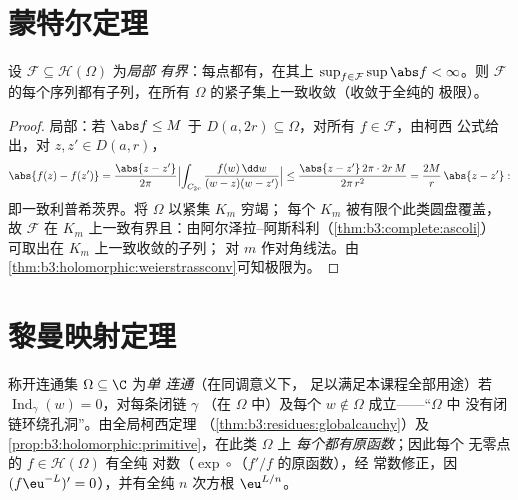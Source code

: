 \section{蒙特尔定理}

\begin{theorem}[蒙特尔]\label{thm:b3:conformal:montel}
设 $\mathcal F \subseteq \mathcal H(\Omega)$ 为\emph{局部
有界}：每点都有，在其上 $\sup_{f\in
\mathcal F}\sup\abs f < \infty$。则
$\mathcal F$ 的每个序列都有子列，在所有
$\Omega$ 的紧子集上一致收敛（收敛于全纯的
极限）。
\end{theorem}

\begin{proof}
局部：若 $\abs f \leq M$ 于 $D(a, 2r)
\subseteq \Omega$，对所有 $f \in \mathcal F$，由柯西
公式给出，对 $z, z' \in D(a, r)$，
\[
\abs{f(z) - f(z')} = \frac{\abs{z - z'}}{2\pi}
\Bigl|\int_{C_{2r}}\frac{f(w)\,\dd w}{(w-z)(w-z')}\Bigr|
\leq \frac{\abs{z - z'}\,2\pi\cdot2r\,M}{2\pi\,r^2}
= \frac{2M}{r}\,\abs{z - z'} :
\]
即一致利普希茨界。将 $\Omega$ 以紧集 $K_m$ 穷竭；
每个 $K_m$ 被有限个此类圆盘覆盖，故
$\mathcal F$ 在
$K_m$ 上一致有界且：由阿尔泽拉–阿斯科利（\cref{thm:b3:complete:ascoli}）
可取出在 $K_m$ 上一致收敛的子列；
对 $m$ 作对角线法。由
\cref{thm:b3:holomorphic:weierstrassconv}可知极限为。
\end{proof}

\section{黎曼映射定理}

\begin{definition}\label{def:b3:conformal:simplyconnected}
称开连通集 $\Omega \subseteq \C$ 为\emph{单
连通}（在同调意义下，
足以满足本课程全部用途）若
$\operatorname{Ind}_\gamma(w) = 0$，对每条闭链 $\gamma$
（在 $\Omega$ 中）及每个 $w \notin \Omega$ 成立——“$\Omega$ 中
没有闭链环绕孔洞”。由全局柯西定理
（\cref{thm:b3:residues:globalcauchy}）及
\cref{prop:b3:holomorphic:primitive}，在此类 $\Omega$ 上
\emph{每个都有原函数}；因此每个
无零点的 $f \in \mathcal H(\Omega)$ 有全纯
对数（$\exp\circ$（$f'/f$ 的原函数），经
常数修正，因 $(f\eu^{-L})' = 0$），并有全纯 $n$ 次方根
$\eu^{L/n}$。
\end{definition}

